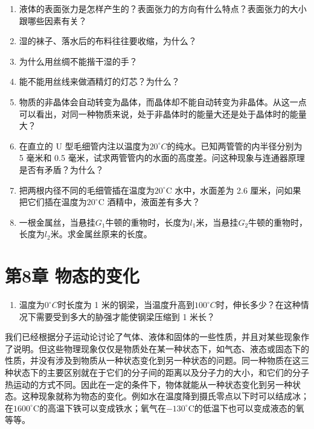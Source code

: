 \begin{enumerate}
\def\labelenumi{\arabic{enumi}.}
\item
  液体的表面张力是怎样产生的？表面张力的方向有什么特点？表面张力的大小跟哪些因素有关？
\item
  湿的袜子、落水后的布料往往要收缩，为什么？
\item
  为什么用丝绸不能揩干湿的手？
\item
  能不能用丝线来做酒精灯的灯芯？为什么？
\item
  物质的非晶体会自动转变为晶体，而晶体却不能自动转变为非晶体。从这一点可以看出，对同一种物质来说，处于非晶体时的能量大还是处于晶体时的能量大？
\item
  在直立的 U
  型毛细管内注以温度为\(20^{\circ}C\)的纯水。已知两管管的内半径分别为 5
  毫米和 0.5
  毫米，试求两管管内的水面的高度差。问这种现象与连通器原理是否有矛盾？为什么？
\item
  把两根内径不同的毛细管插在温度为\(20^{\circ}\)C 水中，水面差为 2.6
  厘米，问如果把它们插在温度为\(20^{\circ}\)C 酒精中，液面差有多大？
\item
  一根金属丝，当悬挂\(G_{1}\)牛顿的重物时，长度为\(l_{1}\)米，当悬挂\(G_{2}\)牛顿的重物时，长度为\(l_{2}\)米。求金属丝原来的长度。
\end{enumerate}

\chapter{第8章
物态的变化}\label{ux7b2c8ux7ae0-ux7269ux6001ux7684ux53d8ux5316}

\begin{enumerate}
\def\labelenumi{\arabic{enumi}.}
\setcounter{enumi}{8}
\tightlist
\item
  温度为\(0^{\circ}C\)时长度为 1
  米的钢梁，当温度升高到\(100^{\circ}C\)时，伸长多少？在这种情况下需要受到多大的胁强才能使钢梁压缩到
  1 米长？
\end{enumerate}

我们已经根据分子运动论讨论了气体、液体和固体的一些性质，并且对某些现象作了说明。但这些物理现象仅仅是物质处在某一种状态下，如气态、液态或固态下的性质，并没有涉及到物质从一种状态变化到另一种状态的问题。同一种物质在这三种状态下的主要区别就在于它们的分子间的距离以及分子力的大小，和它们的分子热运动的方式不同。因此在一定的条件下，物体就能从一种状态变化到另一种状态。这种现象就称为物态的变化。例如水在温度降到摄氏零点以下时可以结成冰；在\(1600^{\circ}\mathrm{C}\)的高温下铁可以变成铁水；氧气在\(-130^{\circ}\mathrm{C}\)的低温下也可以变成液态的氧等等。

